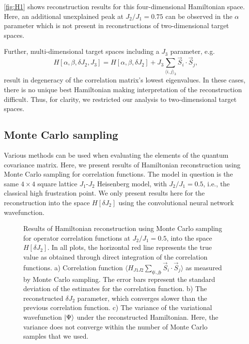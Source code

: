 \documentclass[amsmath,amssymb,aps,prb,superscriptaddress,onecolumn,floatfix]{revtex4}
\begin{document}
\autoref{fig:H1} shows reconstruction results for this four-dimensional Hamiltonian space. Here, an additional unexplained peak at $J_2/J_1 = 0.75$ can be observed in the $\alpha$ parameter which is not present in reconstructions of two-dimensional target spaces.

Further, multi-dimensional target spaces including a $J_3$ parameter, e.g.
\begin{equation}
    H[\alpha, \beta, \delta J_2, J_3] = H[\alpha, \beta, \delta J_2] + J_3 \sum_{\langle i, j\rangle_3} \vec{S}_i \cdot \vec{S}_j,
\end{equation}
result in degeneracy of the correlation matrix's lowest eigenvalues. In these cases, there is no unique best Hamiltonian making interpretation of the reconstruction difficult.
Thus, for clarity, we restricted our analysis to two-dimensional target spaces.

\subsection{Monte Carlo sampling}

Various methods can be used when evaluating the elements of the quantum covariance matrix.
Here, we present results of Hamiltonian reconstruction using Monte Carlo sampling for correlation functions.
The model in question is the same $4 \times 4$ square lattice $J_1$-$J_2$ Heisenberg model, with $J_2/J_1 = 0.5$, i.e., the classical high frustration point.
We only present results here for the reconstruction into the space $H[\delta J_2]$ using the convolutional neural network wavefunction.

\begin{figure*}[htp]
\centering
    
    \caption{Results of Hamiltonian reconstruction using Monte Carlo sampling for operator correlation functions at $J_2/J_1 = 0.5$, into the space $H[\delta J_2]$. In all plots, the horizontal red line represents the true value as obtained through direct integration of the correlation functions.
    a) Correlation function $\langle{H_{J1J2} \sum_{\llangle i, j\rrangle} \vec{S}_i \cdot \vec{S}_j \rangle}$ as measured by Monte Carlo sampling. The error bars represent the standard deviation of the estimates for the correlation function.
    b) The reconstructed $\delta J_2$ parameter, which converges slower than the previous correlation function.
    c) The variance of the variational wavefunction $\ket{\Psi}$ under the reconstructed Hamiltonian. Here, the variance does not converge within the number of Monte Carlo samples that we used.}
    \label{fig:mc}
\end{figure*}
\end{document}
